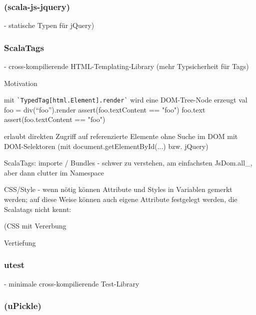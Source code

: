 \documentclass[a4paper, 12pt, hidelinks, listof=totoc, listoftables=totoc, bibliography=totoc]{scrreprt}
\begin{document}
\subsubsection{(scala-js-jquery)}

- statische Typen für jQuery)

\subsubsection{ScalaTags}

- cross-kompilierende HTML-Templating-Library (mehr Typsicherheit für Tags)

Motivation



mit \texttt{\`{}TypedTag[html.Element].render\`} wird eine DOM-Tree-Node erzeugt
  val foo = div("`foo"').render
  assert(foo.textContent == "foo")
  foo.text
  assert(foo.textContent == "foo")

erlaubt direkten Zugriff auf referenzierte Elemente ohne Suche im DOM mit DOM-Selektoren (mit document.getElementById(...) bzw. jQuery)

ScalaTags: importe / Bundles - schwer zu verstehen, am einfachsten JsDom.all\_, aber dann clutter im Namespace

CSS/Style - wenn nötig können Attribute und Styles in Variablen gemerkt werden; auf diese Weise können auch eigene Attribute festgelegt werden, die Scalatags nicht kennt:

(CSS mit Vererbung

Vertiefung


\subsubsection{utest}

- minimale cross-kompilierende Test-Library


\subsubsection{(uPickle)}
\end{document}
